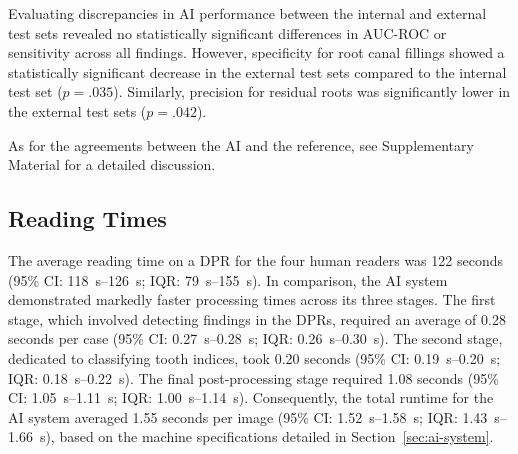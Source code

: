 Evaluating discrepancies in AI performance between the internal and external test sets revealed no statistically significant differences in AUC-ROC or sensitivity across all findings.
However, specificity for root canal fillings showed a statistically significant decrease in the external test sets compared to the internal test set ($p = .035$).
Similarly, precision for residual roots was significantly lower in the external test sets ($p = .042$).

As for the agreements between the AI and the reference, see Supplementary Material for a detailed discussion.

\subsection{Reading Times}

The average reading time on a DPR for the four human readers was 122 seconds (95\% CI: 118~s--126~s; IQR: 79~s--155~s).
In comparison, the AI system demonstrated markedly faster processing times across its three stages.
The first stage, which involved detecting findings in the DPRs, required an average of 0.28 seconds per case (95\% CI: 0.27~s--0.28~s; IQR: 0.26~s--0.30~s).
The second stage, dedicated to classifying tooth indices, took 0.20 seconds (95\% CI: 0.19~s--0.20~s; IQR: 0.18~s--0.22~s).
The final post-processing stage required 1.08 seconds (95\% CI: 1.05~s--1.11~s; IQR: 1.00~s--1.14~s).
Consequently, the total runtime for the AI system averaged 1.55 seconds per image (95\% CI: 1.52~s--1.58~s; IQR: 1.43~s--1.66~s), based on the machine specifications detailed in Section~\ref{sec:ai-system}.